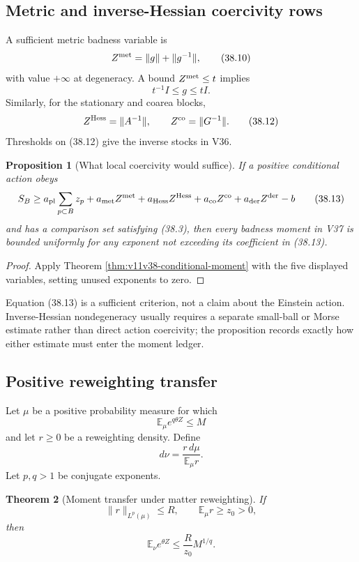 \documentclass[11pt]{article}
\newtheorem{theorem}{Theorem}[section]
\newtheorem{proposition}[theorem]{Proposition}
\begin{document}
\subsection{Metric and inverse-Hessian coercivity rows}

A sufficient metric badness variable is
\[
 Z^{\rm met}
 =
 \|g\|+\|g^{-1}\|,
 \tag{38.10}
\]
with value \(+\infty\) at degeneracy.  A bound
\(Z^{\rm met}\leq t\) implies
\[
 t^{-1}I\leq g\leq tI.
 \tag{38.11}
\]
Similarly, for the stationary and coarea blocks,
\[
 Z^{\rm Hess}=\|A^{-1}\|,
 \qquad
 Z^{\rm co}=\|G^{-1}\|.
 \tag{38.12}
\]
Thresholds on (38.12) give the inverse stocks in V36.

\begin{proposition}[What local coercivity would suffice]
\label{prop:v11v38-sufficient-coercivity}
If a positive conditional action obeys
\[
 S_B
 \geq
 a_{\rm pl}\sum_{p\subset B}z_p
 +a_{\rm met}Z^{\rm met}
 +a_{\rm Hess}Z^{\rm Hess}
 +a_{\rm co}Z^{\rm co}
 +a_{\rm der}Z^{\rm der}
 -b
 \tag{38.13}
\]
and has a comparison set satisfying (38.3), then every badness moment
in V37 is bounded uniformly for any exponent not exceeding its
coefficient in (38.13).
\end{proposition}

\begin{proof}
Apply Theorem \ref{thm:v11v38-conditional-moment} with the five
displayed variables, setting unused exponents to zero.
\end{proof}

Equation (38.13) is a sufficient criterion, not a claim about the
Einstein action.  Inverse-Hessian nondegeneracy usually requires a
separate small-ball or Morse estimate rather than direct action
coercivity; the proposition records exactly how either estimate must
enter the moment ledger.

\subsection{Positive reweighting transfer}

Let \(\mu\) be a positive probability measure for which
\[
 \mathbb E_\mu e^{q\theta Z}\leq M
 \tag{38.14}
\]
and let \(r\geq0\) be a reweighting density.  Define
\[
 d\nu=\frac{r\,d\mu}{\mathbb E_\mu r}.
 \tag{38.15}
\]
Let \(p,q>1\) be conjugate exponents.

\begin{theorem}[Moment transfer under matter reweighting]
\label{thm:v11v38-reweight}
If
\[
 \|r\|_{L^p(\mu)}\leq R,\qquad
 \mathbb E_\mu r\geq z_0>0,
 \tag{38.16}
\]
then
\[
 \mathbb E_\nu e^{\theta Z}
 \leq
 \frac R{z_0}M^{1/q}.
 \tag{38.17}
\]
\end{theorem}
\end{document}
